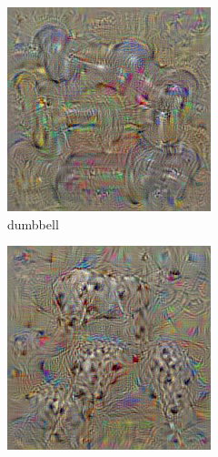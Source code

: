\begin{figure}[t]
  \begin{subfigure}[b]{0.3\textwidth}
    \includegraphics[width=\textwidth]{gfx/deep-visualization-class-1}
    \caption{dumbbell}
    \label{fig:sec:context:deep-visualization-class-1}
  \end{subfigure}
  \hfill
  \begin{subfigure}[b]{0.3\textwidth}
    \includegraphics[width=\textwidth]{gfx/deep-visualization-class-2}

\end{subfigure}
\end{figure}
